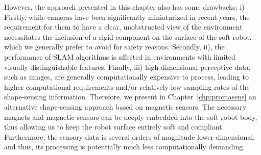 However, the approach presented in this chapter also has some drawbacks: 
i) Firstly, while cameras have been significantly miniaturized in recent years, the requirement for them to have a clear, unobstructed view of the environment necessitates the inclusion of a rigid component on the surface of the soft robot, which we generally prefer to avoid for safety reasons. 
Secondly, ii), the performance of \gls{SLAM} algorithms is affected in environments with limited visually distinguishable features.
Finally, iii) high-dimensional perceptive data, such as images, are generally computationally expensive to process, leading to higher computational requirements and/or relatively low sampling rates of the shape-sensing information.
Therefore, we present in Chapter~\ref{chp:promasens} an alternative shape-sensing approach based on magnetic sensors. The necessary magnets and magnetic sensors can be deeply embedded into the soft robot body, thus allowing us to keep the robot surface entirely soft and compliant. Furthermore, the sensory data is several orders of magnitude lower-dimensional, and thus, its processing is potentially much less computationally demanding.